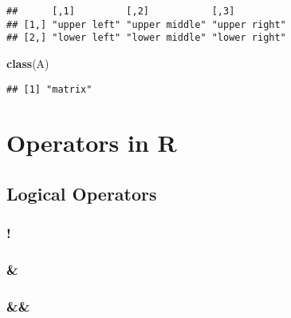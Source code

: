 \documentclass[]{book}
\newenvironment{Shaded}{\begin{snugshade}}{\end{snugshade}}
\newcommand{\KeywordTok}[1]{\textcolor[rgb]{0.13,0.29,0.53}{\textbf{#1}}}
\newcommand{\NormalTok}[1]{#1}
\begin{document}
\begin{verbatim}
##      [,1]         [,2]           [,3]         
## [1,] "upper left" "upper middle" "upper right"
## [2,] "lower left" "lower middle" "lower right"
\end{verbatim}

\begin{Shaded}
\begin{Highlighting}[]
\KeywordTok{class}\NormalTok{(A)}
\end{Highlighting}
\end{Shaded}

\begin{verbatim}
## [1] "matrix"
\end{verbatim}

\hypertarget{operators}{%
\chapter{Operators in R}\label{operators}}

\hypertarget{logicalops}{%
\section*{Logical Operators}\label{logicalops}}

\hypertarget{lognot}{%
\subsection*{\texorpdfstring{\textbf{!}}{!}}\label{lognot}}

\hypertarget{logand}{%
\subsection*{\texorpdfstring{\textbf{\&}}{\&}}\label{logand}}

\hypertarget{logor}{%
\subsection*{\texorpdfstring{\textbf{\textbar{}}}{\textbar{}}}\label{logor}}

\hypertarget{logandsingle}{%
\subsection*{\texorpdfstring{\textbf{\&\&}}{\&\&}}\label{logandsingle}}
\end{document}
